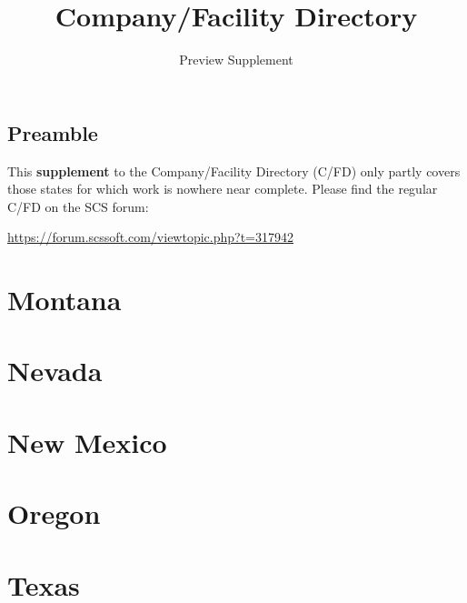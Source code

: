 
\subject{City location descriptions for ATS}
\title{Company\!/Facility Directory}
\subtitle{Preview Supplement}  %


\usepackage{scrlayer-scrpage}  %



\maketitle

\section*{Preamble}

{
\justifying

This \textbf{supplement} to the Company/Facility Directory (C/FD) only partly covers those states for which work is nowhere near complete.
Please find the regular C/FD on the SCS forum:

\centering \vspace{1ex}
\url{https://forum.scssoft.com/viewtopic.php?t=317942} \par
}

\maketoc


%

{%

\chapter{Montana}
}


\chapter{Nevada}


\chapter{New Mexico}


\chapter{Oregon}


\chapter{Texas}


 

